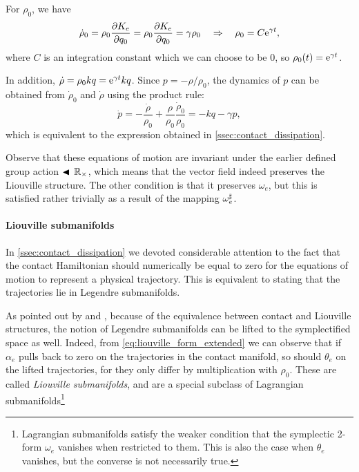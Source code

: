 For $\rho_0$, we have
$$ \dot{\rho}_0 = \rho_0 \pdv{K_e}{q_0} = \rho_0 \pdv{K_e}{q_0}  = \gamma\rho_0 \quad \Rightarrow \quad \rho_0 = C\mathrm{e}^{\gamma t}, $$ 
where $C$ is an integration constant which we can choose to be 0, so $\rho_0(t) = \mathrm{e}^{\gamma t}$.

In addition, $\dot{\rho} = \rho_0 kq = \mathrm{e}^{\gamma t} kq$. Since $p = -\rho/\rho_0$, the dynamics of $p$ can be obtained from  $\dot{\rho}_0$ and $\dot{\rho}$ using the product rule:
\begin{equation} 
    \dot{p} = -\frac{\dot{\rho}}{\rho_0} + \frac{\rho}{\rho_0}\frac{\dot{\rho}_0}{\rho_0} = -kq - \gamma p,
    \label{eq:pdot}
\end{equation}
which is equivalent to the expression obtained in \cref{ssec:contact_dissipation}.

Observe that these equations of motion are invariant under the earlier defined group action $\blacktriangleleft\,\mathbb{R}_{\times}$, which means that the vector field indeed preserves the Liouville structure. The other condition is that it preserves $\omega_e$, but this is satisfied rather trivially as a result of the mapping $\omega_e^\sharp$.

\paragraph{Liouville submanifolds} In \cref{ssec:contact_dissipation} we devoted considerable attention to the fact that the contact Hamiltonian should numerically be equal to zero for the equations of motion to represent a physical trajectory. This is equivalent to stating that the trajectories lie in Legendre submanifolds.

As pointed out by \citet{VanderSchaft2021a} and \citet{Libermann1987}, because of the equivalence between contact and Liouville structures, the notion of Legendre submanifolds can be lifted to the symplectified space as well. Indeed, from \cref{eq:liouville_form_extended} we can observe that if $\alpha_e$ pulls back to zero on the trajectories in the contact manifold, so should $\theta_e$ on the lifted trajectories, for they only differ by multiplication with $\rho_0$. These are called \emph{Liouville submanifolds}, and are a special subclass of Lagrangian submanifolds\footnote{Lagrangian submanifolds satisfy the weaker condition that the symplectic 2-form $\omega_e$ vanishes when restricted to them. This is also the case when $\theta_e$ vanishes, but the converse is not necessarily true.}

